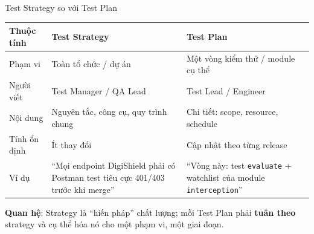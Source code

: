 \documentclass[aspectratio=169,12pt]{beamer}
\begin{document}
\begin{frame}{Test Strategy so với Test Plan}
  \begin{center}
  \footnotesize
  \begin{tabular}{>{\raggedright\arraybackslash}p{2.2cm}>{\raggedright\arraybackslash}p{4.6cm}>{\raggedright\arraybackslash}p{4.6cm}}
    \toprule
    \textbf{Thuộc tính} & \textbf{Test Strategy} & \textbf{Test Plan} \\
    \midrule
    Phạm vi    & Toàn tổ chức / dự án    & Một vòng kiểm thử / module cụ thể \\
    Người viết & Test Manager / QA Lead  & Test Lead / Engineer \\
    Nội dung   & Nguyên tắc, công cụ, quy trình chung & Chi tiết: scope, resource, schedule \\
    Tính ổn định & Ít thay đổi            & Cập nhật theo từng release \\
    Ví dụ      & ``Mọi endpoint DigiShield phải có Postman test tiêu cực 401/403 trước khi merge'' & ``Vòng này: test \texttt{evaluate} + watchlist của module \texttt{interception}'' \\
    \bottomrule
  \end{tabular}
  \end{center}

  \vspace{-0.1em}
  {\small \textbf{Quan hệ}: Strategy là ``hiến pháp'' chất lượng; mỗi Test Plan phải
  \textbf{tuân theo} strategy và cụ thể hóa nó cho một phạm vi, một giai đoạn.}
\end{frame}
\end{document}

